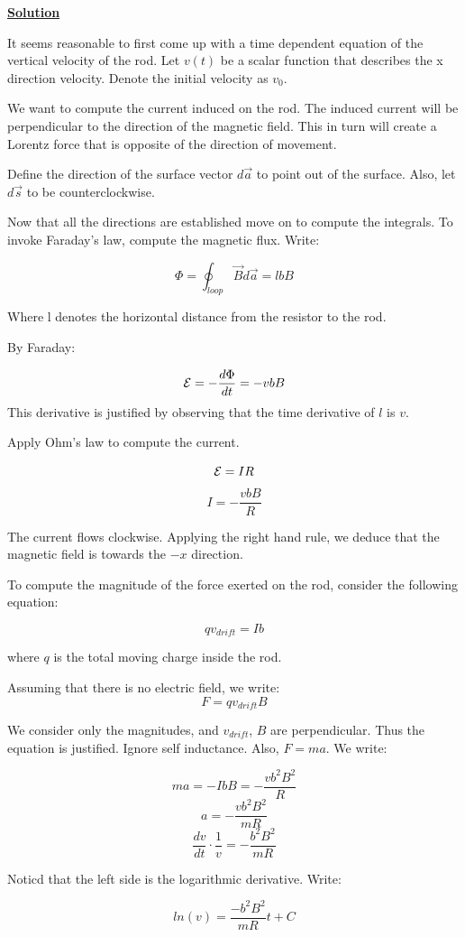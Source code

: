 \documentclass{article}
\newcommand{\new}[1]{
    \vspace{2mm}
    \noindent
    \textbf{
    \underline{#1}}
}
\begin{document}
\new{Solution}
It seems reasonable to first come up 
with a time dependent equation of
the vertical velocity of the rod. Let 
$v(t)$ be a scalar function that describes 
the x direction velocity. Denote the initial 
velocity as $v_0$. 

We want to compute the current induced 
on the rod. The induced current 
will be perpendicular to the direction of 
the magnetic field. This in turn will 
create a Lorentz force that is opposite 
of the direction of movement. 

Define the direction of the surface vector 
$d\vec{a}$ to point out of the surface. 
Also, let $d\vec{s}$ to be counterclockwise. 

Now that all the directions are established 
move on to compute the integrals. To 
invoke Faraday's law, compute the magnetic 
flux. Write:

\[
    \Phi = \oint_{loop} \vec{B}d\vec{a}
     = lbB
\]

Where l denotes the horizontal distance 
from the resistor to the rod. 

By Faraday:

\[
    {\mathcal{E}} = 
    -\frac{d\Phi}{dt}
     = -vbB
\]
This derivative is justified by observing 
that the time derivative of $l$ is $v$. 

Apply Ohm's law to compute the current. 

\[
    {\mathcal{E}} = I R
\]
\[
    I = -\frac{vbB}{R}
\]

The current flows clockwise. 
Applying the right hand rule, 
we deduce that the magnetic field 
is towards the $-x$ direction. 

To compute the magnitude of the 
force exerted on the rod, consider
the following equation:

\[
    qv_{drift} = Ib
\]

where $q$ is the total moving charge 
inside the rod. 

Assuming that there is no electric field, 
we write:
\[
    F = qv_{drift}B
\]

We consider only the magnitudes, and 
$v_{drift}$, $B$ are perpendicular. Thus 
the equation is justified. Ignore self 
inductance. Also, $F = ma$. We write:

\[
    ma = -IbB = -\frac{vb^2B^2}{R}
\]
\[
    a = -\frac{vb^2B^2}{mR}
\]
\[
    \frac{dv}{dt} \cdot \frac{1}{v}
     = 
     -\frac{b^2B^2}{mR}
\]

Noticd that the left side is the logarithmic derivative. 
Write:

\[
    ln(v) = \frac{-b^2B^2}{mR}t+C 
\]
\end{document}
